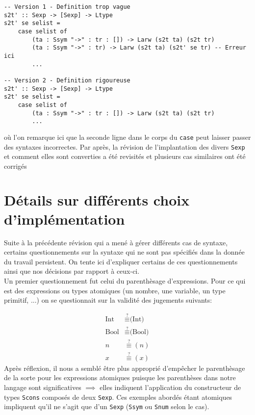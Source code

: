 \documentclass[10pt, titlepage]{article}
\begin{document}
\begin{lstlisting}
-- Version 1 - Definition trop vague
s2t' :: Sexp -> [Sexp] -> Ltype
s2t' se selist =
    case selist of
        (ta : Ssym "->" : tr : []) -> Larw (s2t ta) (s2t tr)
        (ta : Ssym "->" : tr) -> Larw (s2t ta) (s2t' se tr) -- Erreur ici
        ...

-- Version 2 - Definition rigoureuse
s2t' :: Sexp -> [Sexp] -> Ltype
s2t' se selist =
    case selist of
        (ta : Ssym "->" : tr : []) -> Larw (s2t ta) (s2t tr)
        ...
\end{lstlisting}
où l'on remarque ici que la seconde ligne dans le corps du \texttt{case} peut
laisser passer des syntaxes incorrectes. Par après, la révision de
l'implantation des divers \texttt{Sexp} et comment elles sont converties a été
revisités et plusieurs cas similaires ont été corrigés

\section{Détails sur différents choix d'implémentation}

Suite à la précédente révision qui a mené à gérer différents cas de syntaxe,
certains questionnements sur la syntaxe qui ne sont pas spécifiés dans la
donnée du travail persistent. On tente ici d'expliquer certains de ces
questionnements ainsi que nos décisions par rapport à ceux-ci. \\

Un premier questionnement fut celui du parenthèsage d'expressions. Pour ce qui
est des expressions ou types atomiques (un nombre, une variable, un type
primitif, ...) on se questionnait sur la validité des jugements suivants:

\begin{align}
    \text{Int} & \stackrel{?}{\equiv} \text{(Int)} \tag{Type nombres entiers} \\
    \text{Bool} & \stackrel{?}{\equiv} \text{(Bool)} \tag{Type booléens} \\
    n & \stackrel{?}{\equiv} (n) \tag{Un entier} \\
    x & \stackrel{?}{\equiv} (x) \tag{Une variable}
\end{align}
Après réflexion, il nous a semblé être plus approprié d'empêcher le
parenthèsage de la sorte pour les expressions atomiques puisque les parenthèses
dans notre langage sont significatives \(\implies\) elles indiquent
l'application du constructeur de types \texttt{Scons} composés de deux 
\texttt{Sexp}. Ces exemples abordés étant atomiques impliquent qu'il ne s'agit 
que d'un  \texttt{Sexp} (\texttt{Ssym} ou \texttt{Snum} selon le cas). \\
\end{document}
